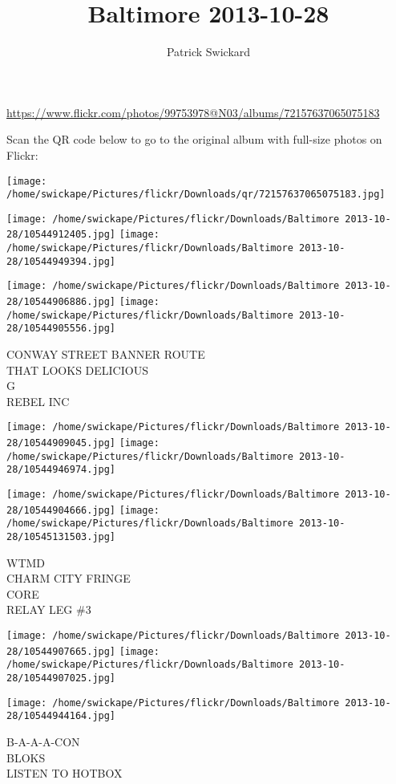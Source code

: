 \documentclass[10pt,letterpaper]{article}
\title{Baltimore 2013-10-28}
\author{Patrick Swickard}
\date{}
\begin{document}
\maketitle

\url{https://www.flickr.com/photos/99753978@N03/albums/72157637065075183}

Scan the QR code below to go to the original album with full-size photos on Flickr:

\texttt{[image: /home/swickape/Pictures/flickr/Downloads/qr/72157637065075183.jpg]}
\pagebreak

\texttt{[image: /home/swickape/Pictures/flickr/Downloads/Baltimore 2013-10-28/10544912405.jpg]}
\texttt{[image: /home/swickape/Pictures/flickr/Downloads/Baltimore 2013-10-28/10544949394.jpg]}

\texttt{[image: /home/swickape/Pictures/flickr/Downloads/Baltimore 2013-10-28/10544906886.jpg]}
\texttt{[image: /home/swickape/Pictures/flickr/Downloads/Baltimore 2013-10-28/10544905556.jpg]}

CONWAY STREET BANNER ROUTE\\
THAT LOOKS DELICIOUS\\
G\\
REBEL INC
\pagebreak

\texttt{[image: /home/swickape/Pictures/flickr/Downloads/Baltimore 2013-10-28/10544909045.jpg]}
\texttt{[image: /home/swickape/Pictures/flickr/Downloads/Baltimore 2013-10-28/10544946974.jpg]}

\texttt{[image: /home/swickape/Pictures/flickr/Downloads/Baltimore 2013-10-28/10544904666.jpg]}
\texttt{[image: /home/swickape/Pictures/flickr/Downloads/Baltimore 2013-10-28/10545131503.jpg]}

WTMD\\
CHARM CITY FRINGE\\
CORE\\
RELAY LEG \#3
\pagebreak

\texttt{[image: /home/swickape/Pictures/flickr/Downloads/Baltimore 2013-10-28/10544907665.jpg]}
\texttt{[image: /home/swickape/Pictures/flickr/Downloads/Baltimore 2013-10-28/10544907025.jpg]}

\vspace{0.25in}
\texttt{[image: /home/swickape/Pictures/flickr/Downloads/Baltimore 2013-10-28/10544944164.jpg]}

B{-}A{-}A{-}A{-}CON\\
BLOKS\\
LISTEN TO HOTBOX
\pagebreak
\end{document}
